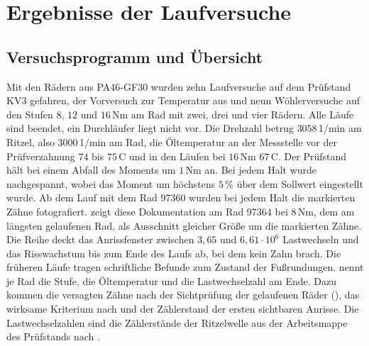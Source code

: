 \chapter{Ergebnisse der Laufversuche}
\label{chap:laufversuche}

\section{Versuchsprogramm und Übersicht}
\label{sec:versuchsprogramm}

Mit den Rädern aus PA46-GF30 wurden zehn Laufversuche auf dem Prüfstand KV3 gefahren, der Vorversuch zur Temperatur aus  und neun Wöhlerversuche auf den Stufen $8$, $12$ und $16$\,Nm am Rad mit zwei, drei und vier Rädern. Alle Läufe sind beendet, ein Durchläufer liegt nicht vor. Die Drehzahl betrug $3058$\,1/min am Ritzel, also $3000$\,1/min am Rad, die Öltemperatur an der Messstelle vor der Prüfverzahnung $74$ bis $75$\,\textdegree C und in den Läufen bei $16$\,Nm $67$\,\textdegree C. Der Prüfstand hält bei einem Abfall des Moments um $1$\,Nm an. Bei jedem Halt wurde nachgespannt, wobei das Moment um höchstens $5$\,\% über dem Sollwert eingestellt wurde. Ab dem Lauf mit dem Rad 97360 wurden bei jedem Halt die markierten Zähne fotografiert.  zeigt diese Dokumentation am Rad 97364 bei $8$\,Nm, dem am längsten gelaufenen Rad, als Ausschnitt gleicher Größe um die markierten Zähne. Die Reihe deckt das Anrissfenster zwischen $3{,}65$ und $6{,}61 \cdot 10^{6}$ Lastwechseln und das Risswachstum bis zum Ende des Laufs ab, bei dem kein Zahn brach. Die früheren Läufe tragen schriftliche Befunde zum Zustand der Fußrundungen.  nennt je Rad die Stufe, die Öltemperatur und die Lastwechselzahl am Ende. Dazu kommen die versagten Zähne nach der Sichtprüfung der gelaufenen Räder (), das wirksame Kriterium nach  und der Zählerstand der ersten sichtbaren Anrisse. Die Lastwechselzahlen sind die Zählerstände der Ritzelwelle aus der Arbeitsmappe des Prüfstands nach .

